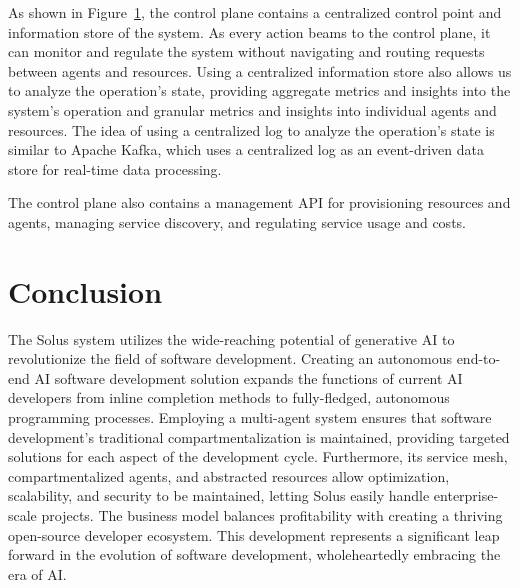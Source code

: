 \documentclass[a4paper,twocolumn,11pt]{quantumarticle}
\begin{document}
\begin{figure}[t]
  \label{fig:control_plane}
\end{figure}
As shown in Figure~\ref{fig:control_plane}, the control plane contains a centralized control point and information store of the system. As every action beams to the control plane, it can monitor and regulate the system without navigating and routing requests between agents and resources. Using a centralized information store also allows us to analyze the operation's state, providing aggregate metrics and insights into the system's operation and granular metrics and insights into individual agents and resources. The idea of using a centralized log to analyze the operation's state is similar to Apache Kafka\cite{kreps2011kafka}, which uses a centralized log as an event-driven data store for real-time data processing.

The control plane also contains a management API for provisioning resources and agents, managing service discovery, and regulating service usage and costs.

\section{Conclusion}

The Solus system utilizes the wide-reaching potential of generative AI to revolutionize the field of software development. Creating an autonomous end-to-end AI software development solution expands the functions of current AI developers from inline completion methods to fully-fledged, autonomous programming processes. Employing a multi-agent system ensures that software development's traditional compartmentalization is maintained, providing targeted solutions for each aspect of the development cycle. Furthermore, its service mesh, compartmentalized agents, and abstracted resources allow optimization, scalability, and security to be maintained, letting Solus easily handle enterprise-scale projects. The business model balances profitability with creating a thriving open-source developer ecosystem. This development represents a significant leap forward in the evolution of software development, wholeheartedly embracing the era of AI.


\end{document}
